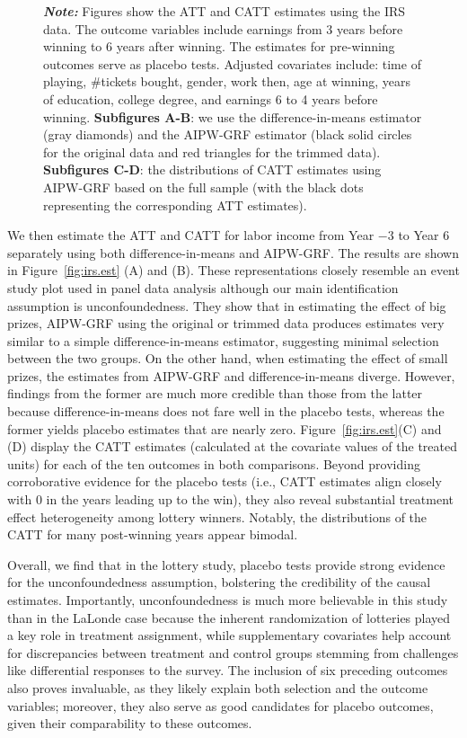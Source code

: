 \documentclass[letterpaper,12pt,leqno]{article}
\begin{document}
\begin{figure}[!ht]
    \raggedright
     {\footnotesize\textbf{\textit{Note:}} Figures show the ATT and CATT estimates using the IRS data. The outcome variables include earnings from 3 years before winning to 6 years after winning.  The estimates for pre-winning outcomes serve as placebo tests. Adjusted covariates include: time of playing, \#tickets bought, gender, work then, age at winning, years of education, college degree, and earnings 6 to 4 years before winning. \textbf{Subfigures A-B}: we use the difference-in-means estimator (gray diamonds) and the AIPW-GRF estimator (black solid circles for the original data and red triangles for the trimmed data).   \textbf{Subfigures C-D}: the distributions of CATT estimates using AIPW-GRF based on the full sample (with the black dots representing the corresponding ATT estimates).}
\end{figure}


We then estimate the ATT and CATT for labor income from Year $-3$ to Year $6$ separately using both difference-in-means and AIPW-GRF. The results are shown in Figure~\ref{fig:irs.est} (A) and (B). These representations closely resemble an event study plot used in panel data analysis although our main identification assumption is unconfoundedness. They show that in estimating the effect of big prizes, AIPW-GRF using the original or trimmed data produces estimates very similar to a simple difference-in-means estimator, suggesting minimal selection between the two groups. On the other hand, when estimating the effect of small prizes, the estimates from AIPW-GRF and difference-in-means diverge. However, findings from the former are much more credible than those from the latter because difference-in-means does not fare well in the placebo tests, whereas the former yields placebo estimates that are nearly zero. Figure~\ref{fig:irs.est}(C) and (D) display the CATT estimates (calculated at the covariate values of the treated units) for each of the ten outcomes in both comparisons. Beyond providing corroborative evidence for the placebo tests (i.e., CATT estimates align closely with 0 in the years leading up to the win), they also reveal substantial treatment effect heterogeneity among lottery winners. Notably, the distributions of the CATT for many post-winning years appear bimodal.

Overall, we find that in the lottery study, placebo tests provide strong evidence for the unconfoundedness assumption, bolstering the credibility of the causal estimates. Importantly, unconfoundedness is much more believable in this study than in the LaLonde case because the inherent randomization of lotteries played a key role in treatment assignment, while supplementary covariates help account for discrepancies between treatment and control groups stemming from challenges like differential responses to the survey. The inclusion of six preceding outcomes also proves invaluable, as they likely explain both selection and the outcome variables; moreover, they also serve as good candidates for placebo outcomes, given their comparability to these outcomes.
\end{document}
